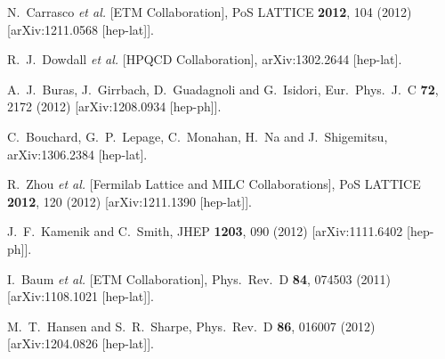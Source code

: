 \begin{thebibliography}{99}
  N.~Carrasco {\it et al.} [ETM Collaboration],
  PoS LATTICE {\bf 2012}, 104 (2012)
  [arXiv:1211.0568 [hep-lat]].
  
  R.~J.~Dowdall {\it et al.}  [HPQCD Collaboration],
  arXiv:1302.2644 [hep-lat].
  
  A.~J.~Buras, J.~Girrbach, D.~Guadagnoli and G.~Isidori,
  Eur.\ Phys.\ J.\ C {\bf 72}, 2172 (2012)
  [arXiv:1208.0934 [hep-ph]].
  
  C.~Bouchard, G.~P.~Lepage, C.~Monahan, H.~Na and J.~Shigemitsu,
  arXiv:1306.2384 [hep-lat].
  
  R.~Zhou {\it et al.} [Fermilab Lattice and MILC Collaborations],
  PoS LATTICE {\bf 2012}, 120 (2012)
  [arXiv:1211.1390 [hep-lat]].
  
  J.~F.~Kamenik and C.~Smith,
  JHEP {\bf 1203}, 090 (2012)
  [arXiv:1111.6402 [hep-ph]].
  
  I.~Baum {\it et al.} [ETM Collaboration],
  Phys.\ Rev.\ D {\bf 84}, 074503 (2011)
  [arXiv:1108.1021 [hep-lat]].
  
  M.~T.~Hansen and S.~R.~Sharpe,
  Phys.\ Rev.\ D {\bf 86}, 016007 (2012)
  [arXiv:1204.0826 [hep-lat]].
  

\end{thebibliography}
